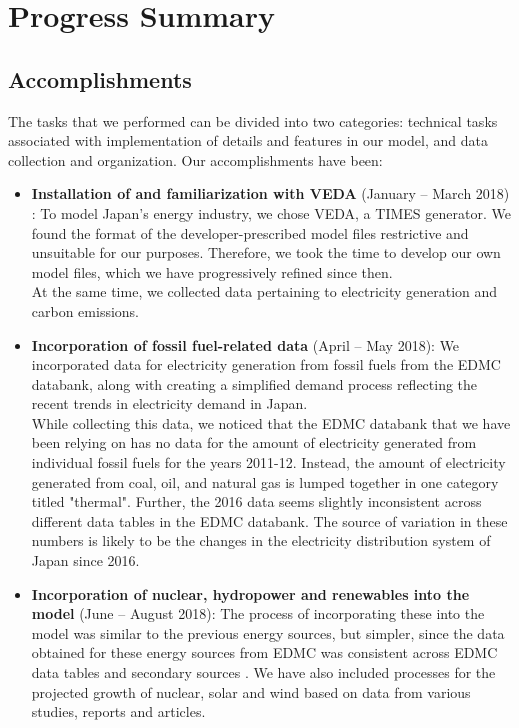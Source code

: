 \documentclass[14pt,a4paper]{article} %
\begin{document}
\section{Progress Summary}

\subsection{Accomplishments}

The tasks that we performed can be divided into two categories: technical tasks associated with implementation of details and features in our model, and data collection and organization. Our accomplishments have been:

\begin{itemize}

\item \textbf{Installation of and familiarization with VEDA} (January – March 2018) : To model Japan's energy industry, we chose VEDA, a \gls{TIMES} \cite{loulou_documentation_2005} \cite{gargiulo_documentation_2005} generator. We found the format of the developer-prescribed model files restrictive and unsuitable for our purposes. Therefore, we took the time to develop our own model files, which we have progressively refined since then.\\

At the same time, we collected data pertaining to electricity generation and carbon emissions.

\item \textbf{Incorporation of fossil fuel-related data} (April – May 2018): We incorporated data for electricity generation from fossil fuels from the \gls{EDMC} databank\cite{noauthor_energy_2018}, along with creating a simplified demand process reflecting the recent trends in electricity demand in Japan. \\

While collecting this data, we noticed that the \gls{EDMC} databank that we have been relying on has no data for the amount of electricity generated from individual fossil fuels for the years 2011-12. Instead, the amount of electricity generated from coal, oil, and natural gas is lumped together in one category titled "thermal". Further, the 2016 data seems slightly inconsistent across different data tables in the \gls{EDMC} databank. The source of variation in these numbers is likely to be the changes in the electricity distribution system of Japan since 2016.

\item \textbf{Incorporation of nuclear, hydropower and renewables into the model} (June – August 2018): The process of incorporating these into the model was similar to the previous energy sources, but simpler, since the data obtained for these energy sources from \gls{EDMC} was consistent across \gls{EDMC} data tables and secondary sources \cite{noauthor_energy_2018} \cite{noauthor_iea_2017} \cite{noauthor_japan_2017}. We have also included processes for the projected growth of nuclear, solar and wind based on data from various studies, reports and articles. \cite{publicover_japan_2017} \cite{dincer_analysis_2011} \cite{noauthor_geothermal_2018} \cite{heger_wind_2016} \cite{noauthor_operational_2013} \cite{noauthor_electricity_2017}


\end{itemize}
\end{document}
